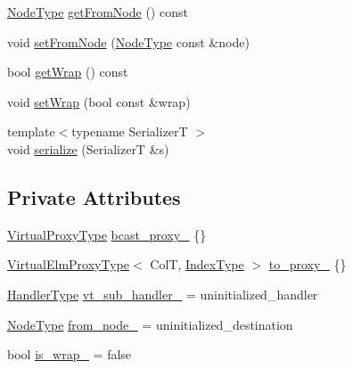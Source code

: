 \begin{DoxyCompactItemize}
\item 
\hyperlink{namespacevt_a866da9d0efc19c0a1ce79e9e492f47e2}{Node\+Type} \hyperlink{structvt_1_1vrt_1_1collection_1_1_collection_message_a642d64890e3ef47a5561ceaede752181}{get\+From\+Node} () const
\item 
void \hyperlink{structvt_1_1vrt_1_1collection_1_1_collection_message_a5bd7fd9ea84e15d528e1546a98f4bd5e}{set\+From\+Node} (\hyperlink{namespacevt_a866da9d0efc19c0a1ce79e9e492f47e2}{Node\+Type} const \&node)
\item 
bool \hyperlink{structvt_1_1vrt_1_1collection_1_1_collection_message_adb0f0904b4bd0646e51dc0a76c54d487}{get\+Wrap} () const
\item 
void \hyperlink{structvt_1_1vrt_1_1collection_1_1_collection_message_a0c5a8830f6079278d7df90d0b6fc07b5}{set\+Wrap} (bool const \&wrap)
\item 
{\footnotesize template$<$typename SerializerT $>$ }\\void \hyperlink{structvt_1_1vrt_1_1collection_1_1_collection_message_a330305ca4c3bf4fec81d0f02637b9a59}{serialize} (SerializerT \&s)
\end{DoxyCompactItemize}
\subsection*{Private Attributes}
\begin{DoxyCompactItemize}
\item 
\hyperlink{namespacevt_a1b417dd5d684f045bb58a0ede70045ac}{Virtual\+Proxy\+Type} \hyperlink{structvt_1_1vrt_1_1collection_1_1_collection_message_a7b1563ec7a2d15faba3b252304beefb6}{bcast\+\_\+proxy\+\_\+} \{\}
\item 
\hyperlink{namespacevt_1_1vrt_a620a5c8c59d13e513f690c74b4af516f}{Virtual\+Elm\+Proxy\+Type}$<$ ColT, \hyperlink{structvt_1_1vrt_1_1collection_1_1_collection_message_a324978c38e67d1bfa86c8db172e77594}{Index\+Type} $>$ \hyperlink{structvt_1_1vrt_1_1collection_1_1_collection_message_ad2fbe6becd494f4983479600010ec39b}{to\+\_\+proxy\+\_\+} \{\}
\item 
\hyperlink{namespacevt_af64846b57dfcaf104da3ef6967917573}{Handler\+Type} \hyperlink{structvt_1_1vrt_1_1collection_1_1_collection_message_a6886f8da35617183db4aa87b259ec7df}{vt\+\_\+sub\+\_\+handler\+\_\+} = uninitialized\+\_\+handler
\item 
\hyperlink{namespacevt_a866da9d0efc19c0a1ce79e9e492f47e2}{Node\+Type} \hyperlink{structvt_1_1vrt_1_1collection_1_1_collection_message_aa129673e8d91d5e3e662f15ae0d8d5fa}{from\+\_\+node\+\_\+} = uninitialized\+\_\+destination
\item 
bool \hyperlink{structvt_1_1vrt_1_1collection_1_1_collection_message_a026bbaa62fe0cb249e575792a4dfe1b6}{is\+\_\+wrap\+\_\+} = false
\end{DoxyCompactItemize}

